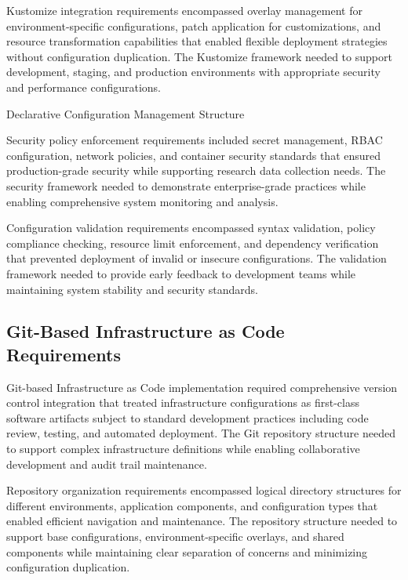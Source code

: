 Kustomize integration requirements encompassed overlay management for environment-specific configurations, patch application for customizations, and resource transformation capabilities that enabled flexible deployment strategies without configuration duplication. The Kustomize framework needed to support development, staging, and production environments with appropriate security and performance configurations.

\begin{table}[H]
\centering
\caption{Declarative Configuration Management Structure}
\label{tab:declarative-config-structure}
\end{table}

Security policy enforcement requirements included secret management, RBAC configuration, network policies, and container security standards that ensured production-grade security while supporting research data collection needs. The security framework needed to demonstrate enterprise-grade practices while enabling comprehensive system monitoring and analysis.

Configuration validation requirements encompassed syntax validation, policy compliance checking, resource limit enforcement, and dependency verification that prevented deployment of invalid or insecure configurations. The validation framework needed to provide early feedback to development teams while maintaining system stability and security standards.


\subsection{Git-Based Infrastructure as Code Requirements}

Git-based Infrastructure as Code implementation required comprehensive version control integration that treated infrastructure configurations as first-class software artifacts subject to standard development practices including code review, testing, and automated deployment. The Git repository structure needed to support complex infrastructure definitions while enabling collaborative development and audit trail maintenance.

Repository organization requirements encompassed logical directory structures for different environments, application components, and configuration types that enabled efficient navigation and maintenance. The repository structure needed to support base configurations, environment-specific overlays, and shared components while maintaining clear separation of concerns and minimizing configuration duplication.

